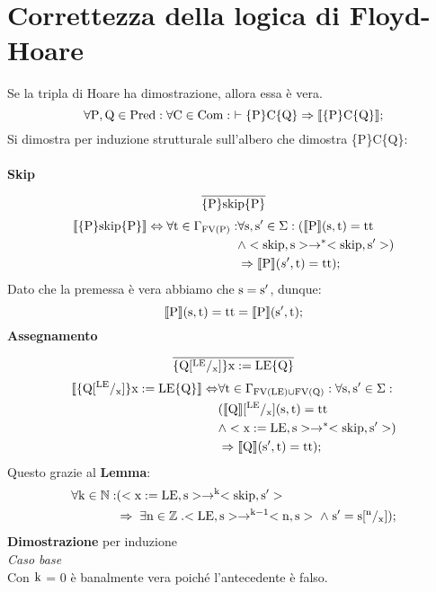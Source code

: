 \documentclass[a4paper, 12pt, oneside,fleqn]{book}
\begin{document}
\section{Correttezza della logica di Floyd-Hoare}
Se la tripla di Hoare ha dimostrazione, allora essa è vera.
$$\forall \mathrm{P},\mathrm{Q} \in \mathrm{Pred} \mathrel{:} \forall \mathrm{C} \in \mathrm{Com} : \ \vdash \{\mathrm{P}\}\mathrm{C}\{\mathrm{Q}\} \Rightarrow \llbracket \{\mathrm{P}\}\mathrm{C}\{\mathrm{Q}\} \rrbracket;$$
Si dimostra per induzione strutturale sull'albero che dimostra \{P\}C\{Q\}:\\\\
\textbf{Skip}
$$\frac{}{\{\mathrm{P}\}\mathrm{skip}\{\mathrm{P}\}}$$
\begin{align*}
\llbracket \{\mathrm{P}\}\mathrm{skip}\{\mathrm{P}\} \rrbracket \Leftrightarrow \forall \mathrm{t} \in \Gamma_{\mathrm{FV}(\mathrm{P})}\mathrel{:}
&\forall \mathrm{s},\mathrm{s}'\in \Sigma \mathrel{:}(\llbracket \mathrm{P} \rrbracket(\mathrm{s},\mathrm{t}) = \mathrm{tt} \\
&\wedge <\mathrm{skip},\mathrm{s}>\rightarrow ^*<\mathrm{skip},\mathrm{s}'>) \\
&\Rightarrow\llbracket \mathrm{P} \rrbracket(s',\mathrm{t})=\mathrm{tt});
\end{align*}
Dato che la premessa è vera abbiamo che $\mathrm{s}=\mathrm{s}'$, dunque:
$$\llbracket \mathrm{P} \rrbracket(\mathrm{s},\mathrm{t})=\mathrm{tt}=\llbracket \mathrm{P} \rrbracket(\mathrm{s}',\mathrm{t});$$
\textbf{Assegnamento}
$$\frac{}{\{\mathrm{Q}[^{\mathrm{LE}}/_{\mathrm{x}}]\}\mathrm{x}:=\mathrm{LE}\{\mathrm{Q}\}}$$
\begin{align*}
\llbracket \{\mathrm{Q}[^{\mathrm{LE}}/_{\mathrm{x}}]\}\mathrm{x}:=\mathrm{LE}\{\mathrm{Q}\} \rrbracket \Leftrightarrow
&\forall \mathrm{t} \in \Gamma_{\mathrm{FV}(\mathrm{LE})\cup \mathrm{FV}(\mathrm{Q})}\mathrel{:}\forall \mathrm{s},\mathrm{s}'\in \Sigma \mathrel{:}\\
&(\llbracket\mathrm{Q} \rrbracket[^{\mathrm{LE}}/_{\mathrm{x}}] (\mathrm{s},\mathrm{t}) = \mathrm{tt}\\
&\wedge <\mathrm{x}:=\mathrm{LE},\mathrm{s}>\rightarrow ^*<\mathrm{skip},\mathrm{s}'>)\\
&\Rightarrow\llbracket \mathrm{Q} \rrbracket(\mathrm{s}',\mathrm{t})=\mathrm{tt});
\end{align*}
Questo grazie al \textbf{Lemma}:
\begin{align*}
\forall \mathrm{k} \in \mathbb{N} \mathrel{:}
&(<\mathrm{x}:=\mathrm{LE},\mathrm{s}> \rightarrow ^{\mathrm{k}}<\mathrm{skip},\mathrm{s}'>\\
&\Rightarrow \hspace{1mm}\exists \mathrm{n} \in \mathbb{Z}\mathrel{.} <\mathrm{LE},\mathrm{s}>\rightarrow ^\mathrm{{k}-1}<\mathrm{n},\mathrm{s}> \hspace{1mm} \wedge \hspace{1mm} \mathrm{s}'= \mathrm{s}[^\mathrm{n}/_{\mathrm{x}}]);
\end{align*}
\textbf{Dimostrazione} per induzione \\
\textit{Caso base}\\
Con $\mathrm{k}$ = 0 è banalmente vera poiché l'antecedente è falso.\\
\end{document}
